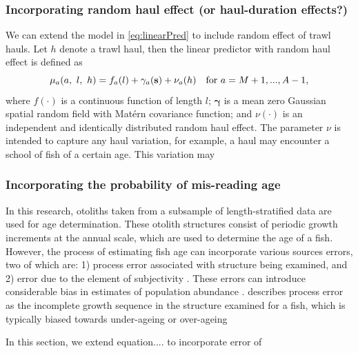 \documentclass[a4paper 12pt]{article}
\numberwithin{equation}{section}
\begin{document}
\subsubsection{Incorporating random haul effect (or haul-duration effects?)}
\label{sec:hauleffect}
We can extend the model in \ref{eq:linearPred} to include random effect of trawl hauls. Let  $h$ denote a trawl haul, then the linear predictor with random haul effect is defined as
\begin{equation}
\mu_{a}(a, \ l, \ h) = f_a(l) + \gamma_a({\bf s}) + \nu_{a} (h) \vspace{ 4mm} \ \ \ \text{for } a =M+1,...,A-1,
\label{eq:linearPredictorWithHaul}
\end{equation}
where $ f(\cdot)$ is a continuous function of length $l$; $\pmb{\gamma}$ is a mean zero Gaussian spatial random field with Mat\'{e}rn covariance function; and $\nu (\cdot)$ is an independent and identically distributed random haul effect. The parameter $\nu$ is intended to capture any haul variation, for example, a haul may encounter a school of fish of a certain age. This variation may 


\subsubsection{Incorporating the probability of mis-reading age}
\label{sec:misreading}

In this research, otoliths taken from a subsample of length-stratified data are used for age determination. These otolith structures  consist of periodic growth increments at the annual scale, which are used to determine the age of a fish. However, the process of estimating fish age can incorporate various sources errors, two of which are: 1) process error associated with structure being examined, and 2) error due to the element of subjectivity \citep{campana2001accuracy, hanselman2012statistical}. These errors can introduce considerable bias in estimates of population abundance \citep{bradford1991effects}. \citet{campana2001accuracy} describes process error as the incomplete growth sequence in the structure examined for a fish, which is typically biased towards under-ageing or over-ageing 

In this section, we extend equation.... to incorporate error of 
\end{document}
